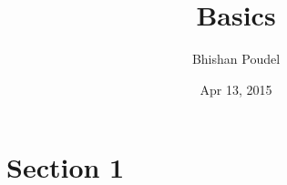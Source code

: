 \documentclass[11pt,a4paper,english]{article}
\title{Basics}
\author{Bhishan Poudel}
\date{Apr 13, 2015}
\begin{document}
\maketitle
\tableofcontents{}

\section{Section 1}
\end{document}
